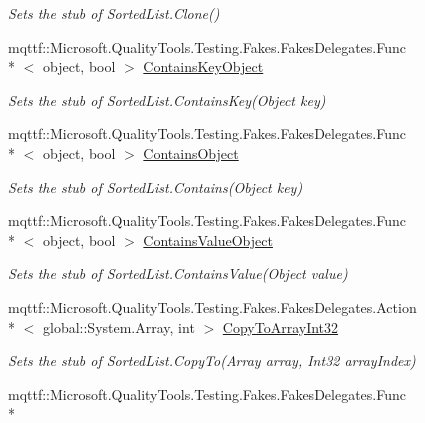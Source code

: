 \begin{DoxyCompactItemize}
\begin{DoxyCompactList}\small\item\em Sets the stub of Sorted\-List.\-Clone()\end{DoxyCompactList}\item 
mqttf\-::\-Microsoft.\-Quality\-Tools.\-Testing.\-Fakes.\-Fakes\-Delegates.\-Func\\*
$<$ object, bool $>$ \hyperlink{class_system_1_1_collections_1_1_fakes_1_1_stub_sorted_list_aeca6eb2e65b6cbf18333bae98fec0a72}{Contains\-Key\-Object}
\begin{DoxyCompactList}\small\item\em Sets the stub of Sorted\-List.\-Contains\-Key(\-Object key)\end{DoxyCompactList}\item 
mqttf\-::\-Microsoft.\-Quality\-Tools.\-Testing.\-Fakes.\-Fakes\-Delegates.\-Func\\*
$<$ object, bool $>$ \hyperlink{class_system_1_1_collections_1_1_fakes_1_1_stub_sorted_list_a60b28df9e07f719f5cef752741bad22a}{Contains\-Object}
\begin{DoxyCompactList}\small\item\em Sets the stub of Sorted\-List.\-Contains(\-Object key)\end{DoxyCompactList}\item 
mqttf\-::\-Microsoft.\-Quality\-Tools.\-Testing.\-Fakes.\-Fakes\-Delegates.\-Func\\*
$<$ object, bool $>$ \hyperlink{class_system_1_1_collections_1_1_fakes_1_1_stub_sorted_list_a29613e958a42b1f21c851eaa27779b13}{Contains\-Value\-Object}
\begin{DoxyCompactList}\small\item\em Sets the stub of Sorted\-List.\-Contains\-Value(\-Object value)\end{DoxyCompactList}\item 
mqttf\-::\-Microsoft.\-Quality\-Tools.\-Testing.\-Fakes.\-Fakes\-Delegates.\-Action\\*
$<$ global\-::\-System.\-Array, int $>$ \hyperlink{class_system_1_1_collections_1_1_fakes_1_1_stub_sorted_list_a4772fc53c61d3c01ce084f82739b4bfa}{Copy\-To\-Array\-Int32}
\begin{DoxyCompactList}\small\item\em Sets the stub of Sorted\-List.\-Copy\-To(\-Array array, Int32 array\-Index)\end{DoxyCompactList}\item 
mqttf\-::\-Microsoft.\-Quality\-Tools.\-Testing.\-Fakes.\-Fakes\-Delegates.\-Func\\*

\end{DoxyCompactItemize}
